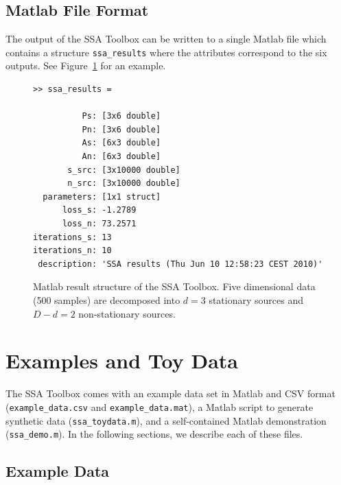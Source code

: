 \documentclass{article}
\newcommand{\1}{\ensuremath{\mathds{1}}}
\newcommand{\0}{\ensuremath{0}}
\begin{document}
\subsection{Matlab File Format}

The output of the SSA Toolbox can be written to a single Matlab file which contains
a structure \texttt{ssa\_results} where the attributes correspond to the six outputs. 
See Figure~\ref{fig:ex_matlab_res} for an example.

\begin{figure}[h]
\centering
\begin{boxedminipage}{12cm}
\begin{verbatim}
>> ssa_results = 

          Ps: [3x6 double]
          Pn: [3x6 double]
          As: [6x3 double]
          An: [6x3 double]
       s_src: [3x10000 double]
       n_src: [3x10000 double]
  parameters: [1x1 struct]
      loss_s: -1.2789
      loss_n: 73.2571
iterations_s: 13
iterations_n: 10
 description: 'SSA results (Thu Jun 10 12:58:23 CEST 2010)'
\end{verbatim}
\end{boxedminipage}
\caption{
Matlab result structure of the SSA Toolbox. Five dimensional data (500 samples) 
are decomposed into $d = 3$ stationary sources and $D-d = 2$ non-stationary sources.
\label{fig:ex_matlab_res}
}
\end{figure}

\FloatBarrier %

\section{Examples and Toy Data}

The SSA Toolbox comes with an example data set in Matlab and CSV format (\texttt{example\_data.csv} and \texttt{example\_data.mat}), a Matlab script to generate synthetic data (\texttt{ssa\_toydata.m}), and a self-contained 
Matlab demonstration (\texttt{ssa\_demo.m}). In the 
following sections, we describe each of these files.

\subsection{Example Data}
\end{document}

